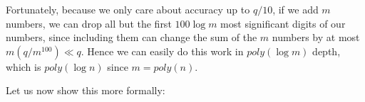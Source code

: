 Fortunately, because we only care about accuracy up to \(q/10\), if we
add \(m\) numbers, we can drop all but the first \(100\log m\) most
significant digits of our numbers, since including them can change the
sum of the \(m\) numbers by at most \(m(q/m^{100}) \ll q\). Hence we can
easily do this work in \(poly(\log m)\) depth, which is \(poly(\log n)\)
since \(m=poly(n)\).

Let us now show this more formally:

\hypertarget{decdepthlem}{}

